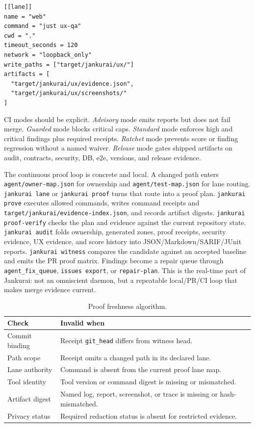 \begin{lstlisting}[style=codebox]
[[lane]]
name = "web"
command = "just ux-qa"
cwd = "."
timeout_seconds = 120
network = "loopback_only"
write_paths = ["target/jankurai/ux/"]
artifacts = [
  "target/jankurai/ux/evidence.json",
  "target/jankurai/ux/screenshots/"
]
\end{lstlisting}

CI modes should be explicit. \emph{Advisory} mode emits reports but does not fail merge. \emph{Guarded} mode blocks critical caps. \emph{Standard} mode enforces high and critical findings plus required receipts. \emph{Ratchet} mode prevents score or finding regression without a named waiver. \emph{Release} mode gates shipped artifacts on audit, contracts, security, DB, e2e, versions, and release evidence.

The continuous proof loop is concrete and local. A changed path enters \texttt{agent/owner-map.json} for ownership and \texttt{agent/test-map.json} for lane routing. \texttt{jankurai lane} or \texttt{jankurai proof} turns that route into a proof plan. \texttt{jankurai prove} executes allowed commands, writes command receipts and \texttt{target/jankurai/evidence-index.json}, and records artifact digests. \texttt{jankurai proof-verify} checks the plan and evidence against the current repository state. \texttt{jankurai audit} folds ownership, generated zones, proof receipts, security evidence, UX evidence, and score history into JSON/Markdown/SARIF/JUnit reports. \texttt{jankurai witness} compares the candidate against an accepted baseline and emits the PR proof matrix. Findings become a repair queue through \texttt{agent\_fix\_queue}, \texttt{issues export}, or \texttt{repair-plan}. This is the real-time part of Jankurai: not an omniscient daemon, but a repeatable local/PR/CI loop that makes merge evidence current.

\begin{table}[t]
\caption{Proof freshness algorithm.}
\label{tab:proof-freshness}
\centering
\scriptsize
\begin{tabularx}{\columnwidth}{L{0.26\columnwidth} Y}
\toprule
\textbf{Check} & \textbf{Invalid when} \\
\midrule
Commit binding & Receipt \texttt{git\_head} differs from witness head. \\
Path scope & Receipt omits a changed path in its declared lane. \\
Lane authority & Command is absent from the current proof lane map. \\
Tool identity & Tool version or command digest is missing or mismatched. \\
Artifact digest & Named log, report, screenshot, or trace is missing or hash-mismatched. \\
Privacy status & Required redaction status is absent for restricted evidence. \\
\bottomrule
\end{tabularx}
\end{table}

